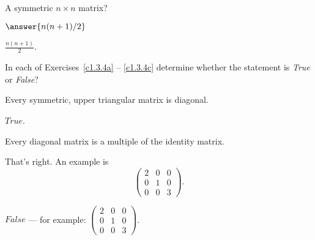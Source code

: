 \documentclass{ximera}
\begin{document}
\begin{exercise}  \label{c1.3.3c}
A symmetric $n\times n$ matrix?   \begin{prompt}$\answer{n(n+1)/2}$\end{prompt}

\begin{solution}
$\frac{n(n + 1)}{2}$.

\end{solution}
\end{exercise}

\noindent In each of Exercises~\ref{c1.3.4a} -- \ref{c1.3.4c} determine
whether the statement is {\em True\/} or {\em False\/}?
\begin{exercise} \label{c1.3.4a}
  Every symmetric, upper triangular matrix is diagonal.
  \begin{multipleChoice}
  \end{multipleChoice}

\begin{solution}
$True$.

\end{solution}
\end{exercise}
\begin{exercise} \label{c1.3.4b}
  Every diagonal matrix is a multiple of the identity matrix.
  \begin{multipleChoice}
  \end{multipleChoice}
  \begin{feedback}
    That's right.   An example is
    \[\left(\begin{array}{ccc}
              2 & 0 & 0 \\
              0 & 1 & 0 \\
              0 & 0 & 3 \end{array}\right).\]
  \end{feedback}

\begin{solution}
$False$ --- for example:
$\left(\begin{array}{ccc}
2 & 0 & 0 \\
0 & 1 & 0 \\
0 & 0 & 3 \end{array}\right)$.

\end{solution}
\end{exercise}
\end{document}
